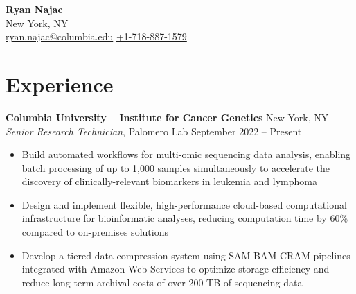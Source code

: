 \documentclass[11pt,a4paper]{article}   %
\begin{document}
\raggedright				%
\thispagestyle{empty}			%

\begin{center}
  {\LARGE 
    \textbf{Ryan Najac}
  }\\
  {\large
    \vspace{0.1cm}New York, NY\\ \vspace{0.1cm}
    \href{mailto:ryan.najac@columbia.edu}{\faEnvelopeSquare\: ryan.najac@columbia.edu} \medspace
    \href{tel:+17188871579}{\faPhoneSquare\: +1-718-887-1579}			       \medspace \\
    \href{https://rdnajac.tech/}{\faGlobe\:             \underline{}} \quad
    \href{https://github.com/rdnajac}{\faGithubSquare\: \underline{}}          \quad
    \href{https://www.linkedin.com/in/ryan-najac/}{\faLinkedinSquare\:  \underline{}}
  }
\end{center}

\vspace{-0.7cm}
\section*{Experience}
\textbf{Columbia University – Institute for Cancer Genetics} \hfill New York, NY\\
\textit{Senior Research Technician}, Palomero Lab \hfill September 2022 – Present
\begin{itemize}[noitemsep, topsep=1pt, partopsep=0pt, parsep=0pt]
  \item Build automated workflows for multi-omic sequencing data analysis, enabling batch processing of up to 1,000
    samples simultaneously to accelerate the discovery of clinically-relevant biomarkers in leukemia and lymphoma
  \item Design and implement flexible, high-performance cloud-based computational infrastructure 
    for bioinformatic analyses, reducing computation time by 60\% compared to on-premises solutions
  \item Develop a tiered data compression system using SAM-BAM-CRAM pipelines integrated with Amazon Web Services
    to optimize storage efficiency and reduce long-term archival costs of over 200 TB of sequencing data
\end{itemize}
\vspace{0.2cm}
\end{document}

